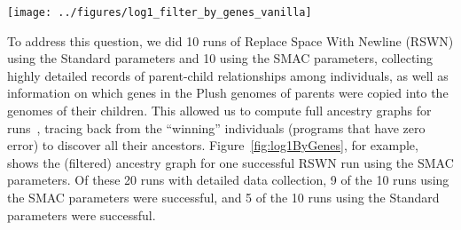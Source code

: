 \begin{figure*}
	\texttt{[image: ../figures/log1\_filter\_by\_genes\_vanilla]}
	\caption{Ancestry graph of a successful Replace Space By Newline run
	using the ``tuned'' parameters discovered by SMAC. This tree is filtered 
	to only include individuals that ultimately passed a gene
	on to the winning individual. Each individual is represented as a
	rectangle whose width is proportional to the number of selections
	it received, and whose color is a function of its error vector.
	Edges indicate parent-child relationships. Dashed black edges indicate
	that the child was constructed via alternation alone; solid black edges 
	indicate alternation followed by uniform mutation. Solid orange edges
	indicate applications of uniform mutation, and dashed orange represent
	applications of uniform close mutation.}
	\label{fig:log1ByGenes}
\end{figure*}

To address this question, we did 10 runs of Replace Space With Newline (RSWN) 
using the Standard parameters and 10 using the SMAC parameters, 
collecting highly detailed records of parent-child relationships 
among individuals, as well as information on which genes in the Plush 
genomes of parents were copied into
the genomes of their children. This allowed us to compute full ancestry
graphs for 
runs~\cite{McPhee:2016:VGP:2908961.2931741,McPhee:2015:GPTP,McPhee:2016:GPTP},
tracing back from the ``winning'' individuals (programs that have zero error)
to discover all their ancestors. Figure~\ref{fig:log1ByGenes}, for example,
shows the (filtered) ancestry graph for one successful RSWN run 
using the SMAC parameters. Of these 20 runs with detailed data collection,
9 of the 10 runs using the SMAC parameters were successful, and 5 of the
10 runs using the Standard parameters were successful.

